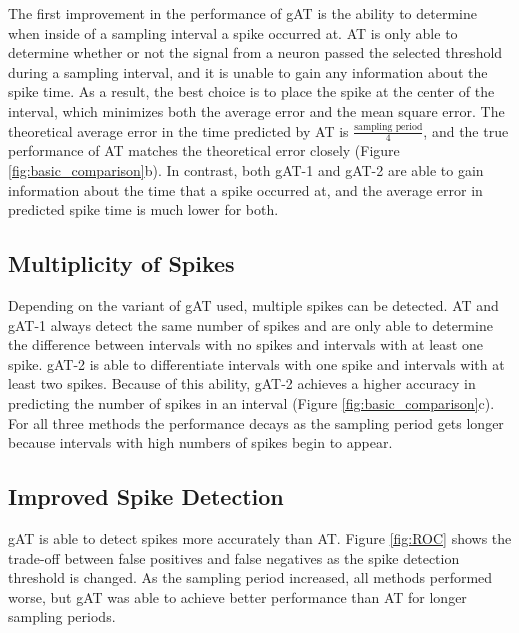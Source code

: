 \documentclass[10 pt]{article}
\begin{document}
The first improvement in the performance of gAT is the ability to determine when inside of a sampling interval a spike occurred at.
AT is only able to determine whether or not the signal from a neuron passed the selected threshold during a sampling interval, and it is unable to gain any information about the spike time.
As a result, the best choice is to place the spike at the center of the interval, which minimizes both the average error and the mean square error.
The theoretical average error in the time predicted by AT is $\frac{\textrm{sampling period}}{4}$, and the true performance of AT matches the theoretical error closely (Figure \ref{fig:basic_comparison}b).
In contrast, both gAT-1 and gAT-2 are able to gain information about the time that a spike occurred at, and the average error in predicted spike time is much lower for both.


\subsection{Multiplicity of Spikes}

Depending on the variant of gAT used, multiple spikes can be detected.
AT and gAT-1 always detect the same number of spikes and are only able to determine the difference between intervals with no spikes and intervals with at least one spike.
gAT-2 is able to differentiate intervals with one spike and intervals with at least two spikes.
Because of this ability, gAT-2 achieves a higher accuracy in predicting the number of spikes in an interval (Figure \ref{fig:basic_comparison}c).
For all three methods the performance decays as the sampling period gets longer because intervals with high numbers of spikes begin to appear.

\subsection{Improved Spike Detection}

gAT is able to detect spikes more accurately than AT.
Figure \ref{fig:ROC} shows the trade-off between false positives and false negatives as the spike detection threshold is changed.
As the sampling period increased, all methods performed worse, but gAT was able to achieve better performance than AT for longer sampling periods.
\end{document}

